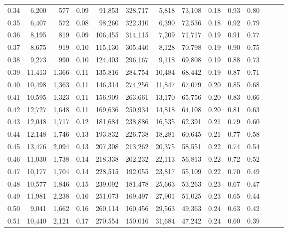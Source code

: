 \begin{tabular}{rrrrrrrrrrrrrr}
0.34 &   6,200 &    577 &  0.09 &   91,853 &  328,717 &   5,818 &  73,108 &  0.18 &  0.93 &      0.80 \\
0.35 &   6,407 &    572 &  0.08 &   98,260 &  322,310 &   6,390 &  72,536 &  0.18 &  0.92 &      0.79 \\
0.36 &   8,195 &    819 &  0.09 &  106,455 &  314,115 &   7,209 &  71,717 &  0.19 &  0.91 &      0.77 \\
0.37 &   8,675 &    919 &  0.10 &  115,130 &  305,440 &   8,128 &  70,798 &  0.19 &  0.90 &      0.75 \\
0.38 &   9,273 &    990 &  0.10 &  124,403 &  296,167 &   9,118 &  69,808 &  0.19 &  0.88 &      0.73 \\
0.39 &  11,413 &  1,366 &  0.11 &  135,816 &  284,754 &  10,484 &  68,442 &  0.19 &  0.87 &      0.71 \\
0.40 &  10,498 &  1,363 &  0.11 &  146,314 &  274,256 &  11,847 &  67,079 &  0.20 &  0.85 &      0.68 \\
0.41 &  10,595 &  1,323 &  0.11 &  156,909 &  263,661 &  13,170 &  65,756 &  0.20 &  0.83 &      0.66 \\
0.42 &  12,727 &  1,648 &  0.11 &  169,636 &  250,934 &  14,818 &  64,108 &  0.20 &  0.81 &      0.63 \\
0.43 &  12,048 &  1,717 &  0.12 &  181,684 &  238,886 &  16,535 &  62,391 &  0.21 &  0.79 &      0.60 \\
0.44 &  12,148 &  1,746 &  0.13 &  193,832 &  226,738 &  18,281 &  60,645 &  0.21 &  0.77 &      0.58 \\
0.45 &  13,476 &  2,094 &  0.13 &  207,308 &  213,262 &  20,375 &  58,551 &  0.22 &  0.74 &      0.54 \\
0.46 &  11,030 &  1,738 &  0.14 &  218,338 &  202,232 &  22,113 &  56,813 &  0.22 &  0.72 &      0.52 \\
0.47 &  10,177 &  1,704 &  0.14 &  228,515 &  192,055 &  23,817 &  55,109 &  0.22 &  0.70 &      0.49 \\
0.48 &  10,577 &  1,846 &  0.15 &  239,092 &  181,478 &  25,663 &  53,263 &  0.23 &  0.67 &      0.47 \\
0.49 &  11,981 &  2,238 &  0.16 &  251,073 &  169,497 &  27,901 &  51,025 &  0.23 &  0.65 &      0.44 \\
0.50 &   9,041 &  1,662 &  0.16 &  260,114 &  160,456 &  29,563 &  49,363 &  0.24 &  0.63 &      0.42 \\
0.51 &  10,440 &  2,121 &  0.17 &  270,554 &  150,016 &  31,684 &  47,242 &  0.24 &  0.60 &      0.39 \\

\end{tabular}
